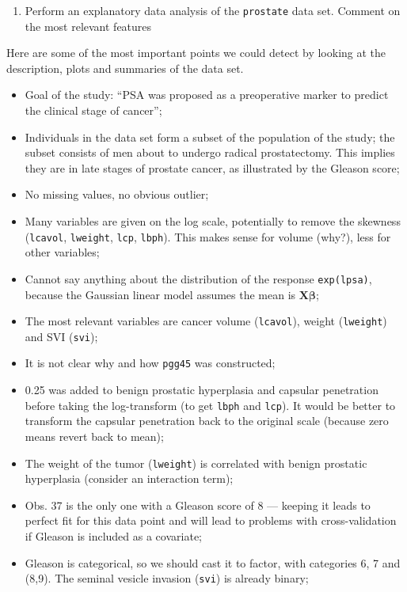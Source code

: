 \documentclass[]{book}
\providecommand{\tightlist}{%
  \setlength{\itemsep}{0pt}\setlength{\parskip}{0pt}}
\theoremstyle{definition}
\theoremstyle{definition}
\theoremstyle{definition}
\theoremstyle{remark}
\begin{document}
\begin{enumerate}
\def\labelenumi{\alph{enumi}.}
\setcounter{enumi}{9}
\tightlist
\item
  Perform an explanatory data analysis of the \texttt{prostate} data
  set. Comment on the most relevant features
\end{enumerate}

Here are some of the most important points we could detect by looking at
the description, plots and summaries of the data set.

\begin{itemize}
\tightlist
\item
  Goal of the study: ``PSA was proposed as a preoperative marker to
  predict the clinical stage of cancer'';
\item
  Individuals in the data set form a subset of the population of the
  study; the subset consists of men about to undergo radical
  prostatectomy. This implies they are in late stages of prostate
  cancer, as illustrated by the Gleason score;
\item
  No missing values, no obvious outlier;
\item
  Many variables are given on the log scale, potentially to remove the
  skewness (\texttt{lcavol}, \texttt{lweight}, \texttt{lcp},
  \texttt{lbph}). This makes sense for volume (why?), less for other
  variables;
\item
  Cannot say anything about the distribution of the response
  \texttt{exp(lpsa)}, because the Gaussian linear model assumes the mean
  is \(\mathbf{X}\boldsymbol{\beta}\);
\item
  The most relevant variables are cancer volume (\texttt{lcavol}),
  weight (\texttt{lweight}) and SVI (\texttt{svi});
\item
  It is not clear why and how \texttt{pgg45} was constructed;
\item
  0.25 was added to benign prostatic hyperplasia and capsular
  penetration before taking the log-transform (to get \texttt{lbph} and
  \texttt{lcp}). It would be better to transform the capsular
  penetration back to the original scale (because zero means revert back
  to mean);
\item
  The weight of the tumor (\texttt{lweight}) is correlated with benign
  prostatic hyperplasia (consider an interaction term);
\item
  Obs. 37 is the only one with a Gleason score of 8 --- keeping it leads
  to perfect fit for this data point and will lead to problems with
  cross-validation if Gleason is included as a covariate;
\item
  Gleason is categorical, so we should cast it to factor, with
  categories 6, 7 and (8,9). The seminal vesicle invasion (\texttt{svi})
  is already binary;
\end{itemize}
\end{document}
